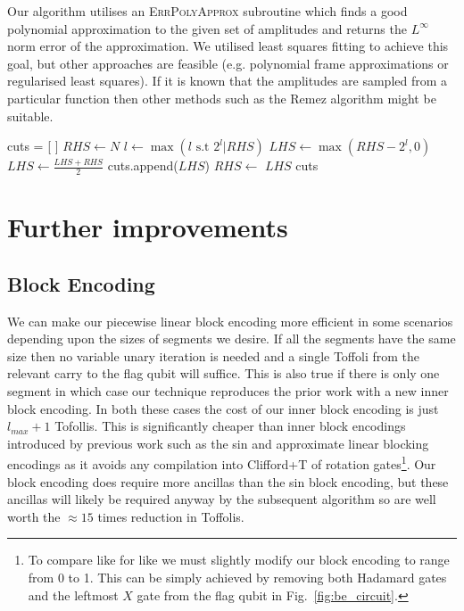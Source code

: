 \documentclass[aps,prx,twocolumn,floatfix,10pt,amssymb,amsfont,amsmath,superscriptaddress,float,nofootinbib,longbibliography,nobalancelastpage]{revtex4-2}
\theoremstyle{empty}
\begin{document}
Our algorithm utilises an \textsc{\footnotesize ErrPolyApprox} subroutine which finds a good polynomial approximation to the given set of amplitudes and returns the $L^\infty$ norm error of the approximation. We utilised least squares fitting to achieve this goal, but other approaches are feasible (e.g. polynomial frame approximations or regularised least squares). If it is known that the amplitudes are sampled from a particular function then other methods such as the Remez algorithm might be suitable.
\begin{algorithm}[H]
\caption{Performs at most $N\log_2 N$ queries to \textsc{\footnotesize ErrPolyApprox} and returns the optimal cuts between the pieces of the polynomial}\label{alg:piecewise_classical_approx}
    \begin{algorithmic}[1]
        \State cuts = [ ]
        \State $RHS \gets N$ 
        \State $l \gets \max (l \text{ s.t } 2^l | RHS)$
        \State $LHS \gets \max (RHS - 2^l,0)$
            \State $LHS \gets \frac{LHS + RHS}{2}$
        \EndWhile
        \State cuts.append($LHS$)
        \State $RHS \gets$ $LHS$
        \EndWhile
        \State \Return cuts
    \end{algorithmic}
\end{algorithm}
\section{Further improvements}
\subsection{Block Encoding}
\label{section:improve-be}We can make our piecewise linear block encoding more efficient in some scenarios depending upon the sizes of segments we desire. If all the segments have the same size then no variable unary iteration is needed and a single Toffoli from the relevant carry to the flag qubit will suffice. This is also true if there is only one segment in which case our technique reproduces the prior work \cite{mcardleQuantumStatePreparation2022} with a new inner block encoding. In both these cases the cost of our inner block encoding is just $l_{max} + 1$ Tofollis. This is significantly cheaper than inner block encodings introduced by previous work such as the sin \cite{mcardleQuantumStatePreparation2022} and approximate linear \cite{Gonzalez-Conde:2023fjg} blocking encodings as it avoids any compilation into Clifford+T of rotation gates\footnote{To compare like for like we must slightly modify our block encoding to range from 0 to 1. This can be simply achieved by removing both Hadamard gates and the leftmost $X$ gate from the flag qubit in Fig.~\ref{fig:be_circuit}.}. Our block encoding does require more ancillas than the sin block encoding, but these ancillas will likely be required anyway by the subsequent algorithm so are well worth the $\approx 15$ times reduction in Toffolis.
\end{document}
